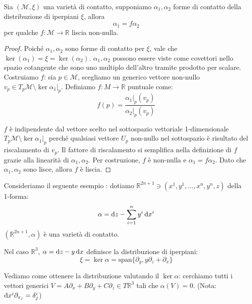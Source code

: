 \begin{lemma}
    Sia $(\mathcal{M}, \xi)$ una varietà di contatto, supponiamo \(\alpha_1, \alpha_2\) forme di contatto della distribuzione di iperpiani $\xi$, allora
    \[
        \alpha_1 = f \alpha_2
    \]
    per qualche \(f : \mathcal{M} \longrightarrow \mathbb{R}\) liscia non-nulla.
\end{lemma}

\begin{proof}
    Poiché \(\alpha_1, \alpha_2\) sono forme di contatto per $\xi$, vale che $\ker(\alpha_1) = \xi = \ker(\alpha_2)$.
    $\alpha_1, \alpha_2$ possono essere viste come covettori nello spazio cotangente che sono uno multiplo dell'altro tramite prodotto per scalare.
    Costruiamo $f$: sia $p \in \mathcal{M}$, scegliamo un generico vettore non-nullo $v_p \in T_p \mathcal{M} \setminus \ker \alpha_{1}|_p$.
    Definiamo $f : M \to \mathbb{R}$ puntuale come:
    \begin{equation*}
        f(p) = \frac{\alpha_{1}|_p(v_p)}{\alpha_{2}|_p(v_p)}
    \end{equation*}

    $f$ è indipendente dal vettore scelto nel sottospazio vettoriale 1-dimensionale $T_p \mathcal{M} \setminus \ker \alpha_{1}|_p$ perché qualsiasi vettore $U_p$ non-nullo nel sottospazio è risultato del riscalamento di $v_p$.
    Il fattore di riscalamento si semplifica nella definizione di $f$ grazie alla linearità di $\alpha_1, \alpha_2$.
    Per costruzione, $f$ è non-nulla e $\alpha_1 = f \alpha_2$.
    Dato che $\alpha_1, \alpha_2$ sono lisce, allora $f$ è liscia.
\end{proof}

Consideriamo il seguente esempio \cite{jiang_thermodynamics}: dotiamo $\mathbb{R}^{2n+1} \ni (x^1, y^1, \dots, x^n, y^n, z)$ della 1-forma:
\begin{equation*}
    \alpha = \odif{z} - \sum_{i=1}^{n} y^i \odif{x^i}
\end{equation*}
$(\mathbb{R}^{2n+1}, \alpha)$ è una varietà di contatto.

Nel caso $\mathbb{R}^3$, $\alpha = \odif{z} - y \odif{x}$ definisce la distribuzione di iperpiani:
\begin{equation*}
    \xi = \ker \alpha = \text{span}\{\partial_y, y \partial_z + \partial_x\}
\end{equation*}

Vediamo come ottenere la distribuzione valutando il $\ker \alpha$: cerchiamo tutti i vettori generici $V = A \partial_x + B \partial_y + C \partial_z \in T\mathbb{R}^3$ tali che $\alpha(V) = 0$.
(Nota: $\odif{x^i} \partial_{x_j} = \delta^i_j$)

